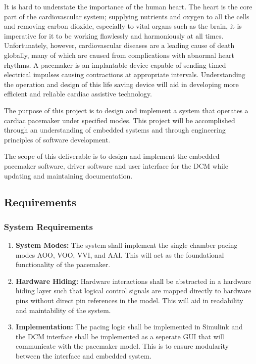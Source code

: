 \documentclass{article}
\begin{document}
It is hard to understate the importance of the human heart. The heart is the core part of the cardiovascular system; supplying nutrients and oxygen to all the cells
and removing carbon dioxide, especially to vital organs such as the brain, it is imperative for it to be working flawlessly and harmoniously at all times.
Unfortunately, however, cardiovascular diseases are a leading cause of death globally, many of which are caused from complications with 
abnormal heart rhythms. A pacemaker is an implantable device capable of sending timed electrical impulses causing contractions at 
appropriate intervals. Understanding the operation and design of this life saving device will aid in developing 
more efficient and reliable cardiac assistive technology. 

The purpose of this project is to design and implement a system that operates a cardiac pacemaker 
under specified modes. This project will be accomplished through an understanding of embedded systems and through engineering 
principles of software development. 

The scope of this deliverable is to design and implement the embedded pacemaker software, driver software and user interface for 
the DCM while updating and maintaining documentation. 



\subsection{Requirements}

\subsubsection{System Requirements}

\begin{enumerate}[label=]
    \item \textbf{System Modes:} The system shall implement the single chamber pacing modes AOO, VOO, VVI, and AAI. This will act 
    as the foundational functionality of the pacemaker. 
    \item \textbf{Hardware Hiding:} Hardware interactions shall be abstracted in a hardware hiding layer such that 
    logical control signals are mapped directly to hardware pins without direct pin references in the model. This 
    will aid in readability and maintability of the system.
    \item \textbf{Implementation:} The pacing logic shall be implemented in Simulink and the DCM interface shall 
    be implemented as a seperate GUI that will communicate with the pacemaker model. This is to ensure modularity 
    between the interface and embedded system.
\end{enumerate}
\end{document}
